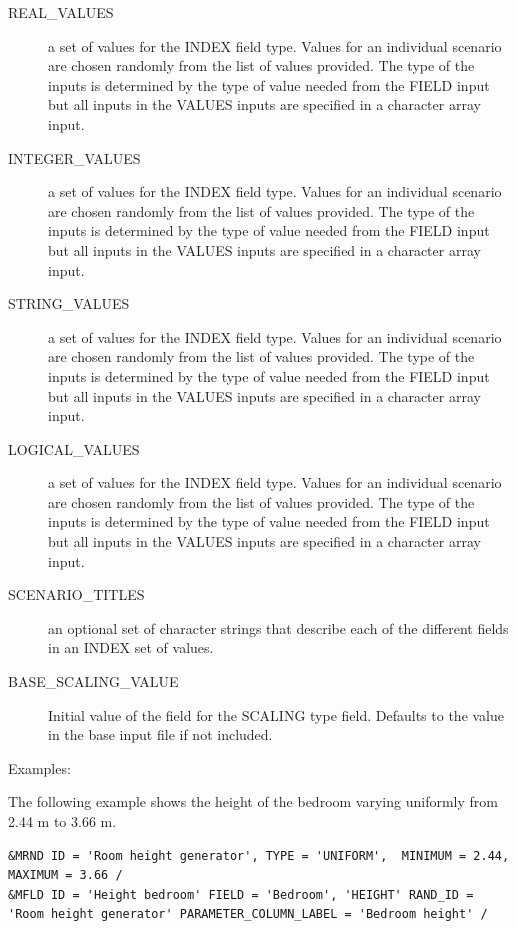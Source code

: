 \documentclass[12pt,twoside]{book}
\begin{document}
\begin{description}
  \item[REAL\_VALUES] a set of values for the {\ct INDEX} field type. Values for an individual scenario are chosen randomly from the list of values provided. The type of the inputs is determined by the type of value needed from the {\ct FIELD} input but all inputs in the {\ct VALUES} inputs are specified in a character array input.
  \item[INTEGER\_VALUES] a set of values for the {\ct INDEX} field type. Values for an individual scenario are chosen randomly from the list of values provided. The type of the inputs is determined by the type of value needed from the {\ct FIELD} input but all inputs in the {\ct VALUES} inputs are specified in a character array input.
  \item[STRING\_VALUES] a set of values for the {\ct INDEX} field type. Values for an individual scenario are chosen randomly from the list of values provided. The type of the inputs is determined by the type of value needed from the {\ct FIELD} input but all inputs in the {\ct VALUES} inputs are specified in a character array input.
  \item[LOGICAL\_VALUES] a set of values for the {\ct INDEX} field type. Values for an individual scenario are chosen randomly from the list of values provided. The type of the inputs is determined by the type of value needed from the {\ct FIELD} input but all inputs in the {\ct VALUES} inputs are specified in a character array input.
  \item[SCENARIO\_TITLES] an optional set of character strings that describe each of the different fields in an {\ct INDEX} set of values.
  \item[BASE\_SCALING\_VALUE] Initial value of the field for the {\ct SCALING} type field. Defaults to the value in the base input file if not included.
\end{description}

\vspace{\baselineskip}
\noindent Examples:

The following example shows the height of the bedroom varying uniformly from 2.44 m to 3.66 m.
\begin{lstlisting}[language=cdata, basicstyle=\scriptsize]
&MRND ID = 'Room height generator', TYPE = 'UNIFORM',  MINIMUM = 2.44, MAXIMUM = 3.66 /
&MFLD ID = 'Height bedroom' FIELD = 'Bedroom', 'HEIGHT' RAND_ID = 'Room height generator' PARAMETER_COLUMN_LABEL = 'Bedroom height' /
\end{lstlisting}
\end{document}
